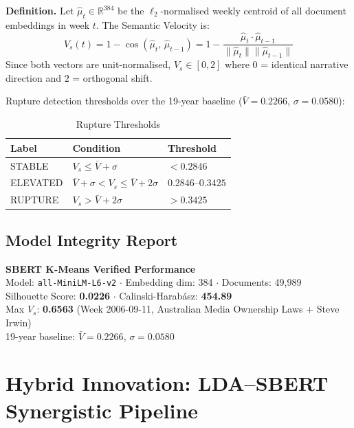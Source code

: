 \documentclass[12pt,a4paper]{article}
\begin{document}
\begin{formulabox}
\textbf{Definition.} Let $\hat{\mu}_t \in \mathbb{R}^{384}$ be the $\ell_2$-normalised
weekly centroid of all document embeddings in week $t$. The Semantic Velocity is:
\[
V_s(t) = 1 - \cos(\hat{\mu}_t,\, \hat{\mu}_{t-1})
       = 1 - \frac{\hat{\mu}_t \cdot \hat{\mu}_{t-1}}{\|\hat{\mu}_t\|\|\hat{\mu}_{t-1}\|}
\]
Since both vectors are unit-normalised, $V_s \in [0, 2]$ where
$0$ = identical narrative direction and $2$ = orthogonal shift.
\end{formulabox}

\noindent Rupture detection thresholds over the 19-year baseline
($\bar{V} = 0.2266$, $\sigma = 0.0580$):

\begin{table}[H]
\centering
\caption{Rupture Thresholds}
\begin{tabular}{lll}
\toprule
\textbf{Label} & \textbf{Condition} & \textbf{Threshold} \\
\midrule
STABLE   & $V_s \leq \bar{V} + \sigma$   & $< 0.2846$ \\
ELEVATED & $\bar{V}+\sigma < V_s \leq \bar{V}+2\sigma$ & $0.2846$--$0.3425$ \\
RUPTURE  & $V_s > \bar{V} + 2\sigma$     & $> 0.3425$ \\
\bottomrule
\end{tabular}
\label{tab:thresholds}
\end{table}

\subsection{Model Integrity Report}

\begin{resultbox}
\textbf{SBERT K-Means Verified Performance}\\
Model: \texttt{all-MiniLM-L6-v2} $\cdot$ Embedding dim: 384 $\cdot$ Documents: 49,989\\
Silhouette Score: \textbf{0.0226} $\cdot$ Calinski-Harabász: \textbf{454.89}\\
Max $V_s$: \textbf{0.6563} (Week 2006-09-11, Australian Media Ownership Laws + Steve Irwin)\\
19-year baseline: $\bar{V}{=}0.2266$, $\sigma{=}0.0580$
\end{resultbox}

\section{Hybrid Innovation: LDA--SBERT Synergistic Pipeline}
\label{sec:hybrid}
\end{document}
